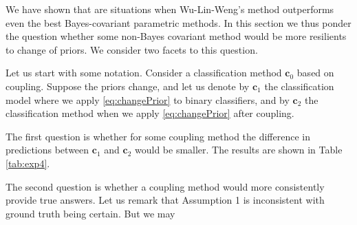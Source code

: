We have shown that are situations when Wu-Lin-Weng's method outperforms even the best Bayes-covariant parametric methods. In this section we thus ponder the question whether some non-Bayes covariant method would be more resilients to change of priors. We consider two facets to this question.

Let us start with some notation. Consider a classification method $\boldsymbol{c}_0$ based on coupling. Suppose the priors change, and let us denote by $\boldsymbol{c}_1$ the classification model where we apply \eqref{eq:changePrior} to binary classifiers, and by $\boldsymbol{c}_2$ the classification method when we apply \eqref{eq:changePrior} after coupling. 

The first question is whether for some coupling method the difference in predictions between $\boldsymbol{c}_1$ and $\boldsymbol{c}_2$ would be smaller. The results are shown in Table \ref{tab:exp4}. 




The second question is whether a coupling method would more consistently provide true answers. Let us remark that Assumption 1 is inconsistent with ground truth being certain. But we may 
